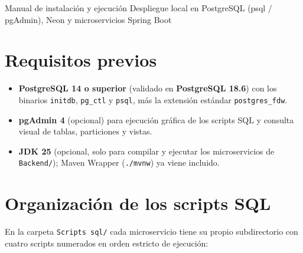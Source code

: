 \documentclass[11pt,oneside]{article}
\begin{document}
  {Manual de instalaci\'on y ejecuci\'on}
  {Despliegue local en PostgreSQL (psql / pgAdmin), Neon y microservicios Spring Boot}

\tableofcontents
\vspace{0.5em}

\section{Requisitos previos}

\begin{itemize}[leftmargin=1.5em, itemsep=3pt]
  \item \textbf{PostgreSQL 14 o superior} (validado en \textbf{PostgreSQL 18.6})
        con los binarios \texttt{initdb}, \texttt{pg\_ctl} y \texttt{psql}, m\'as
        la extensi\'on est\'andar \texttt{postgres\_fdw}.
  \item \textbf{pgAdmin 4} (opcional) para ejecuci\'on gr\'afica de los
        scripts SQL y consulta visual de tablas, particiones y vistas.
  \item \textbf{JDK 25} (opcional, solo para compilar y ejecutar los
        microservicios de \texttt{Backend/}); Maven Wrapper (\texttt{./mvnw})
        ya viene incluido.
\end{itemize}

\section{Organizaci\'on de los scripts SQL}

En la carpeta \texttt{Scripts sql/} cada microservicio tiene su propio
subdirectorio con cuatro scripts numerados en orden estricto de ejecuci\'on:
\end{document}
